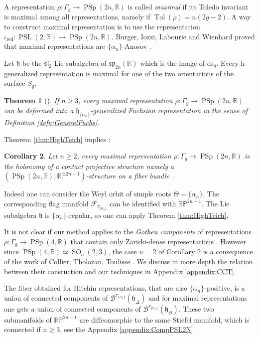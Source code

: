 \documentclass[reqno,10pt]{amsart}
\theoremstyle{plain}
\newtheorem{thm}{Theorem}[section]
\newtheorem{cor}[thm]{Corollary}
\theoremstyle{definition}
\theoremstyle{remark}
\newcommand{\type}{\tau}
\newcommand{\R}{\mathbb{R}}
\DeclareMathOperator{\Tol}{Tol}
\DeclareMathOperator{\PSL}{PSL}
\DeclareMathOperator{\SO}{SO}
\DeclareMathOperator{\PSp}{PSp}
\newcommand{\ie}{namely }
\begin{document}
A representation $\rho:\Gamma_g\to \PSp(2n,\R)$ is called \emph{maximal} if its Toledo invariant is maximal among all representations, \ie if $\Tol(\rho)=n(2g-2)$. A way to construct maximal representation is to use the representation $\iota_\text{red}:\PSL(2,\R)\to \PSp(2n,\R)$. Burger, Iozzi, Labourie and Wienhard proved that maximal representations are $\lbrace \alpha_n\rbrace $-Anosov \cite{BurgerIozziWienhardLabourie}.

Let $\mathfrak{h}$ be the $\mathfrak{sl}_2$ Lie subalgebra of $\mathfrak{sp}_{2n}(\R)$ which is the image of $\mathrm{d}\iota_\mathfrak{h}$. Every $\mathrm{h}$-generalized representation is maximal for one of the two orientations of the surface $S_g$.

\begin{thm}[{\cite{GuichardWienhardMaximality}}]
If $n\geq 3$, every maximal representation $\rho:\Gamma_g\to \PSp(2n,\R)$ can be deformed into a $\mathfrak{h}_{\lbrace\alpha_n\rbrace}$-generalized Fuchsian representation in the sense of Definition \ref{defn:GeneralFuchs}.
\end{thm}
 Theorem \ref{thm:HighTeich} implies :

\begin{cor}
\label{cor:Maximal}
Let $n\geq 2$, every maximal representation $\rho:\Gamma_g\to \PSp(2n,\R)$ is the holonomy of a contact projective structure \ie a $\left(\PSp(2n,\R), \mathbb{RP}^{2n-1}\right)$-structure on a fiber bundle .
\end{cor}

Indeed one can consider the Weyl orbit of simple roots  $\Theta=\lbrace \alpha_n\rbrace $. The corresponding flag manifold $\mathcal{F}_{\tau_{\lbrace\alpha_n\rbrace}}$ can be identified with $\mathbb{RP}^{2n-1}$. The Lie subalgebra $\mathfrak{h}$ is $\lbrace\alpha_n\rbrace$-regular, so one can apply Theorem \ref{thm:HighTeich}.

\medskip

It is not clear if our method applies to the \emph{Gothen components} of representations $\rho:\Gamma_g\to \PSp(4, \R)$ that contain only Zariski-dense representations \cite{Gothen}. However since $\PSp(4,\R)\simeq \SO_o(2,3)$, the case $n=2$ of Corollary \ref{cor:Maximal} is a consequence of the work of Collier, Tholozan, Toulisse \cite{Collier_2019}. We discuss in more depth the relation between their consruction and our techniques in Appendix \ref{appendix:CCT}.

\medskip

The fiber obtained for Hitchin representations, that are also ${\lbrace\alpha_n\rbrace}$-positive, is a union of connected components of $\mathcal{B}^{\type_{\lbrace\alpha_n\rbrace}}(\mathfrak{h}_\Delta)$ and for maximal representations one gets a union of connected components of $\mathcal{B}^{\type_{\lbrace\alpha_n\rbrace}}(\mathfrak{h}_\Theta)$. These two submanifolds of $\mathbb{RP}^{2n-1}$ are diffeomorphic to the same Stiefel manifold, which is connected if $n\geq 3$, see the Appendix \ref{appendix:CompPSL2N}.
\end{document}

